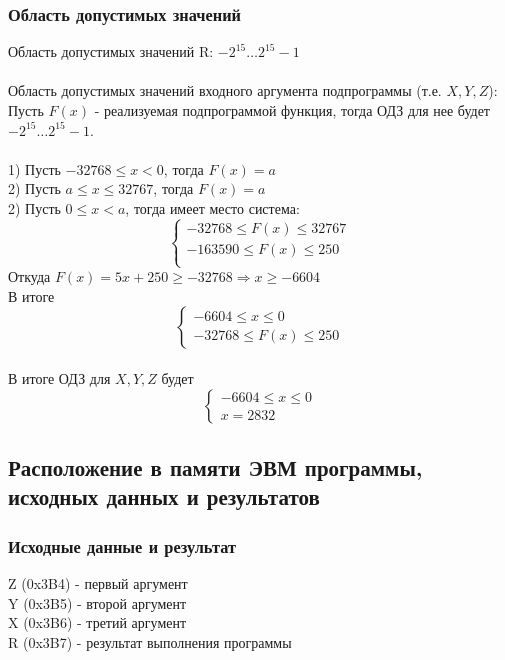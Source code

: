 \subsubsection{Область допустимых значений}
\noindent Область допустимых значений R: $-2^{15}\ldots2^{15}-1$\\
\\
Область допустимых значений входного аргумента подпрограммы (т.е. $ X,Y,Z $):\\
\hspace*{1cm} Пусть $ F(x) $ - реализуемая подпрограммой функция, тогда ОДЗ для нее будет $-2^{15}\ldots2^{15}-1$.\\
\\
\hspace*{1cm} 1) Пусть $ -32768 \leq x<0 $, тогда $ F(x) = a $
\\
\hspace*{1cm} 2) Пусть $ a \leq x \leq 32767 $, тогда $ F(x) = a $
\\
\hspace*{1cm} 2) Пусть $ 0 \leq x < a $, тогда имеет место система:
\[
	\begin{cases}
	-32768 \leq F(x) \leq 32767\\
	-163 590\leq F(x)\leq 250\\
	\end{cases}
\]
\hspace*{1cm}Откуда $ F(x) = 5x + 250 \geq -32768 \Rightarrow x \geq -6604$\\
\hspace*{1cm}В итоге \[
	\begin{cases}
	-6604 \leq x \leq 0\\
	-32768 \leq F(x) \leq 250
	\end{cases}
\]
\\

В итоге ОДЗ для $ X, Y, Z $ будет
\[
\begin{cases}
-6604 \leq x \leq 0 \\
x = 2832
\end{cases}
\]

\subsection{Расположение в памяти ЭВМ программы, исходных данных и результатов}
\subsubsection{Исходные данные и результат}
\noindent Z (0x3B4) - первый аргумент\\
Y (0x3B5) - второй аргумент\\
X (0x3B6) - третий аргумент\\
R (0x3B7) - результат выполнения программы\\
